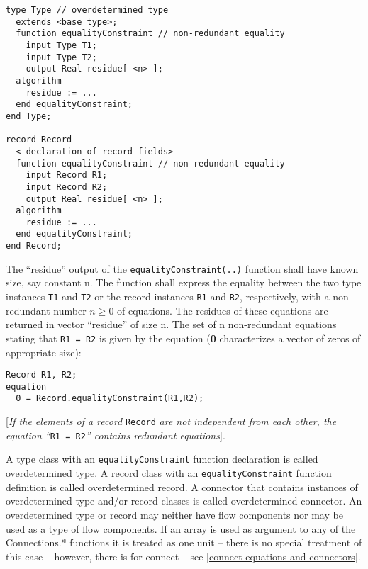 \begin{lstlisting}[language=modelica]
type Type // overdetermined type
  extends <base type>;
  function equalityConstraint // non-redundant equality
    input Type T1;
    input Type T2;
    output Real residue[ <n> ];
  algorithm
    residue := ...
  end equalityConstraint;
end Type;

record Record
  < declaration of record fields>
  function equalityConstraint // non-redundant equality
    input Record R1;
    input Record R2;
    output Real residue[ <n> ];
  algorithm
    residue := ...
  end equalityConstraint;
end Record;
\end{lstlisting}
The ``residue'' output of the \lstinline!equalityConstraint(..)! function shall have
known size, say constant n. The function shall express the equality
between the two type instances \lstinline!T1! and \lstinline!T2! or the record instances 
\lstinline!R1! and
\lstinline!R2!, respectively, with a non-redundant number $ n \ge 0$ of equations. The
residues of these equations are returned in vector ``residue'' of size
n. The set of n non-redundant equations stating that \lstinline!R1 = R2! is given by
the equation (\textbf{0} characterizes a vector of zeros of appropriate
size):

\begin{lstlisting}[language=modelica]
  Record R1, R2;
equation
  0 = Record.equalityConstraint(R1,R2);
\end{lstlisting}
{[}\emph{If the elements of a record} \lstinline!Record! \emph{are not independent
from each other, the equation ``}\lstinline!R1 = R2!\emph{'' contains redundant
equations}{]}.

A type class with an \lstinline!equalityConstraint! function declaration is called
overdetermined type. A record class with an \lstinline!equalityConstraint! function
definition is called overdetermined record. A connector that contains
instances of overdetermined type and/or record classes is called
overdetermined connector. An overdetermined type or record may neither
have flow components nor may be used as a type of flow components. If an
array is used as argument to any of the Connections.* functions it is
treated as one unit -- there is no special treatment of this case --
however, there is for connect -- see \autoref{connect-equations-and-connectors}.

